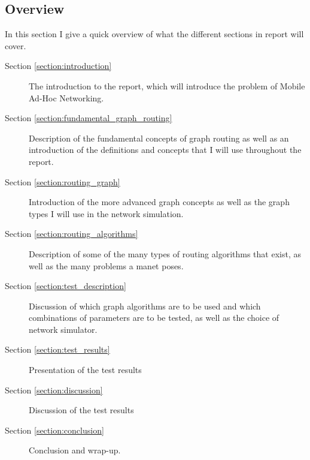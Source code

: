 \subsection{Overview}
In this section I give a quick overview of what the different sections in report will cover.
\begin{description}
\item[Section \ref{section:introduction}] The introduction to the report, which will introduce the problem of Mobile Ad-Hoc Networking.
\item[Section \ref{section:fundamental_graph_routing}] Description of the fundamental concepts of graph routing as well as an introduction of the definitions and concepts that I will use throughout the report.
\item[Section \ref{section:routing_graph}] Introduction of the more advanced graph concepts as well as the graph types I will use in the network simulation.
\item[Section \ref{section:routing_algorithms}] Description of some of the many types of routing algorithms that exist, as well as the many problems a \ac{manet} poses.
\item[Section \ref{section:test_description}] Discussion of which graph algorithms are to be used and which combinations of parameters are to be tested, as well as the choice of network simulator.
\item[Section \ref{section:test_results}] Presentation of the test results
\item[Section \ref{section:discussion}] Discussion of the test results
\item[Section \ref{section:conclusion}] Conclusion and wrap-up.
\end{description}
